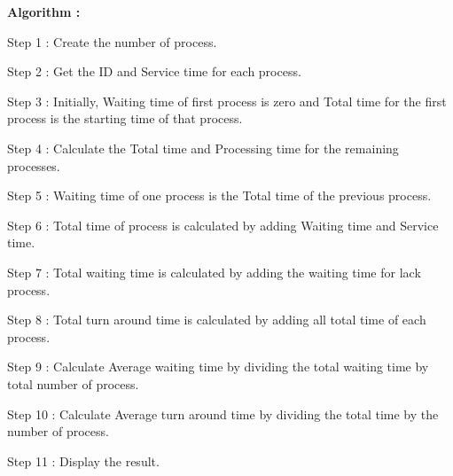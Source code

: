 \documentclass[journal,onecolumn]{IEEEtran}
\begin{document}
\textbf{Algorithm : }
\begin{list}{}{}
  \item Step 1 : Create the number of process.
  \item Step 2 : Get the ID and Service time for each process.
  \item Step 3 : Initially, Waiting time of first process is zero and Total time for the
        first process is the starting time of that process.
  \item Step 4 : Calculate the Total time and Processing time for the remaining
        processes.
  \item Step 5 : Waiting time of one process is the Total time of the previous
        process.
  \item Step 6 : Total time of process is calculated by adding Waiting time and Service
        time.
  \item Step 7 : Total waiting time is calculated by adding the waiting time for lack
        process.
  \item Step 8 : Total turn around time is calculated by adding all total time of each
        process.
  \item Step 9 : Calculate Average waiting time by dividing the total waiting time by
        total number of process.
  \item Step 10 : Calculate Average turn around time by dividing the total time by
        the number of process.
  \item Step 11 : Display the result.
\end{list}
\end{document}
